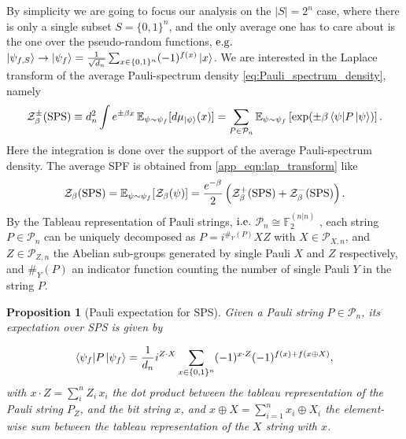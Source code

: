 \documentclass[aps,pra,superscriptaddress,twocolumn,longbibliography]{revtex4-2}
\newtheorem{proposition}{Proposition}
\begin{document}
By simplicity we are going to focus our analysis on the $|S|=2^{n}$ case, where there is only a single subset $S=\{0,1\}^{n}$, and the only average one has to care about is the one over the pseudo-random functions, ${\rm e.g.}$ $\ket{\psi_{f,S}} \to \ket{\psi_{f}}=\frac{1}{\sqrt{d_{n}}}\sum_{ x\in \{0,1\}^{n}} (-1)^{f(x)}\ket{x}$. We are interested in the Laplace transform of the average Pauli-spectrum density \eqref{eq:Pauli_spectrum_density}, namely 
%
\begin{equation}
\label{app_eqn:lap_transform}
    \mathcal{Z}_{\beta}^{\pm}({\rm SPS})\equiv d_{n}^{2}\int e^{\pm\beta x} \,\mathbb{E}_{\psi \sim \psi_{f}}[d\mu_{\ket{\psi}}(x)]=\sum_{P \in \mathcal{P}_{n}}\mathbb{E}_{\psi \sim \psi_{f}}\left[  \exp(\pm\beta \braket{\psi|P\,|\psi}) \right].
\end{equation}
%
Here the integration is done over the support of the average Pauli-spectrum density. The average SPF is obtained from \eqref{app_eqn:lap_transform} like 
%
\begin{equation}
    \mathcal{Z}_{\beta}({\rm SPS}) =\mathbb{E}_{\psi \sim \psi_{f}}[\mathcal{Z}_{\beta}(\psi)]=\frac{e^{-\beta}}{2}\left(\mathcal{Z}_{\beta}^{+}({\rm SPS})+\mathcal{Z}_{\beta}^{-}({\rm SPS})\right).
\end{equation}
%
By the Tableau representation of Pauli strings, ${\rm i.e.}$ $\mathcal{P}_{n} \cong \mathbb{F}_{2}^{(n|n)}$ \cite{Aronsson_gottesman/Tableau/2004}, each string $P \in \mathcal{P}_{n}$ can be uniquely decomposed as $P=i^{\#_{Y}(P)} X Z$ with $X \in \mathcal{P}_{X,n}$, and $Z \in \mathcal{P}_{Z,n}$ the Abelian sub-groups generated by single Pauli $X$ and $Z$ respectively, and $\#_{Y}(P)$ an indicator function counting the number of single Pauli $Y$ in the string $P$.

\begin{proposition}[Pauli expectation for SPS]\label{app_prop:SPS_matel}
    Given a Pauli string $P \in \mathcal{P}_{n}$, its expectation over SPS is given by 

    \begin{equation}
    \braket{\psi_{f}|P\,|\psi_{f}}=\frac{1}{d_{n}}i^{Z\cdot X}\sum_{x \in \{0,1\}^{n}}(-1)^{x \cdot Z}(-1)^{f(x)+f(x\oplus X) },
\end{equation}
%
with $x \cdot Z= \sum_{i}^{n} Z_{i}\,x_{i}$ the dot product between the tableau representation of the Pauli string $P_{Z}$, and the bit string $x$, and $x\oplus X=\sum_{i=1}^{n}x_{i}\oplus X_{i}$ the element-wise sum between the tableau representation of the $X$ string with $x$.
\end{proposition}
\end{document}
